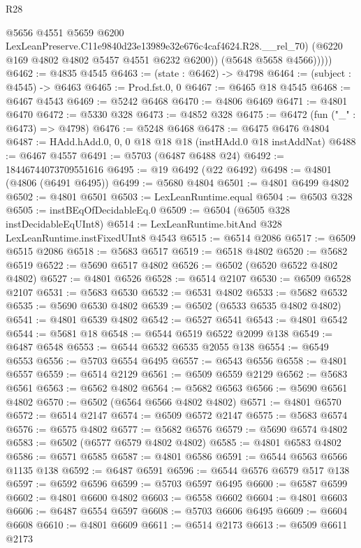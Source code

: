 \begin{lexlean}{R28}
\begin{coremodule}
                @5656
                @4551
                @5659
                @6200
                LexLeanPreserve.C11e9840d23e13989e32e676c4caf4624.R28.__rel_70)
              (@6220 @169 @4802 @4802 @5457 @4551 @6232 @6200))
            (@5648 @5658 @4566)))))
@6462 := @4835 @4545
@6463 := (state : @6462) -> @4798
@6464 := (subject : @4545) -> @6463
@6465 := Prod.fst.{0, 0}
@6467 := @6465 @18 @4545
@6468 := @6467 @4543
@6469 := @5242 @6468
@6470 := @4806 @6469
@6471 := @4801 @6470
@6472 := @5330 @328
@6473 := @4852 @328
@6475 := @6472 (fun ("_" : @6473) => @4798)
@6476 := @5248 @6468
@6478 := @6475 @6476 @4804
@6487 := HAdd.hAdd.{0, 0, 0} @18 @18 @18 (instHAdd.{0} @18 instAddNat)
@6488 := @6467 @4557
@6491 := @5703 (@6487 @6488 @24)
@6492 := 18446744073709551616
@6495 := @19 @6492 (@22 @6492)
@6498 := @4801 (@4806 (@6491 @6495))
@6499 := @5680 @4804
@6501 := @4801 @6499 @4802
@6502 := @4801 @6501
@6503 := LexLeanRuntime.equal
@6504 := @6503 @328
@6505 := instBEqOfDecidableEq.{0}
@6509 := @6504 (@6505 @328 instDecidableEqUInt8)
@6514 := LexLeanRuntime.bitAnd @328 LexLeanRuntime.instFixedUInt8 @4543
@6515 := @6514 @2086
@6517 := @6509 @6515 @2086
@6518 := @5683 @6517
@6519 := @6518 @4802
@6520 := @5682 @6519
@6522 := @5690 @6517 @4802
@6526 := @6502 (@6520 @6522 @4802 @4802)
@6527 := @4801 @6526
@6528 := @6514 @2107
@6530 := @6509 @6528 @2107
@6531 := @5683 @6530
@6532 := @6531 @4802
@6533 := @5682 @6532
@6535 := @5690 @6530 @4802
@6539 := @6502 (@6533 @6535 @4802 @4802)
@6541 := @4801 @6539 @4802
@6542 := @6527 @6541
@6543 := @4801 @6542
@6544 := @5681 @18
@6548 := @6544 @6519 @6522 @2099 @138
@6549 := @6487 @6548
@6553 := @6544 @6532 @6535 @2055 @138
@6554 := @6549 @6553
@6556 := @5703 @6554 @6495
@6557 := @6543 @6556
@6558 := @4801 @6557
@6559 := @6514 @2129
@6561 := @6509 @6559 @2129
@6562 := @5683 @6561
@6563 := @6562 @4802
@6564 := @5682 @6563
@6566 := @5690 @6561 @4802
@6570 := @6502 (@6564 @6566 @4802 @4802)
@6571 := @4801 @6570
@6572 := @6514 @2147
@6574 := @6509 @6572 @2147
@6575 := @5683 @6574
@6576 := @6575 @4802
@6577 := @5682 @6576
@6579 := @5690 @6574 @4802
@6583 := @6502 (@6577 @6579 @4802 @4802)
@6585 := @4801 @6583 @4802
@6586 := @6571 @6585
@6587 := @4801 @6586
@6591 := @6544 @6563 @6566 @1135 @138
@6592 := @6487 @6591
@6596 := @6544 @6576 @6579 @517 @138
@6597 := @6592 @6596
@6599 := @5703 @6597 @6495
@6600 := @6587 @6599
@6602 := @4801 @6600 @4802
@6603 := @6558 @6602
@6604 := @4801 @6603
@6606 := @6487 @6554 @6597
@6608 := @5703 @6606 @6495
@6609 := @6604 @6608
@6610 := @4801 @6609
@6611 := @6514 @2173
@6613 := @6509 @6611 @2173

\end{coremodule}
\end{lexlean}
